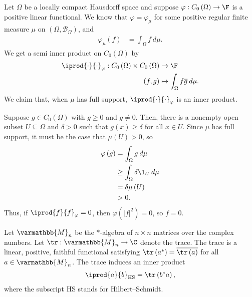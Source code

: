\documentclass[10pt]{mypackage}
\renewcommand*{\mathbb}[1]{\varmathbb{#1}}
\begin{document}
\begin{example}
  Let $\Omega$ be a locally compact Hausdorff space and suppose $\varphi: C_0\left(\Omega\right)\rightarrow \F$ is a positive linear functional. We know that $\varphi = \varphi_{\mu}$ for some positive regular finite measure $\mu$ on $\left(\Omega,\mathcal{B}_{\Omega}\right)$, and
  \begin{align*}
    \varphi_{\mu}\left(f\right) &= \int_{\Omega}^{} f\:d\mu.
  \end{align*}
  We get a semi inner product on $C_{0}\left(\Omega\right)$ by
  \begin{align*}
    \iprod{\cdot}{\cdot}_{\varphi}: C_0\left(\Omega\right)\times C_0\left(\Omega\right) &\rightarrow \F\\
    \left(f,g\right) &\mapsto \int_{\Omega}^{} f\overline{g}\:d\mu.
  \end{align*}
  We claim that, when $\mu$ has full support, $ \iprod{\cdot}{\cdot}_{\varphi} $ is an inner product.\newline

  Suppose $g\in C_0\left(\Omega\right)$ with $g\geq 0$ and $g \neq 0$. Then, there is a nonempty open subset $U\subseteq \Omega$ and $\delta > 0$ such that $g(x) \geq \delta$ for all $x\in U$. Since $\mu$ has full support, it must be the case that $\mu\left(U\right) > 0$, so
  \begin{align*}
    \varphi\left(g\right) &= \int_{\Omega}^{} g\:d\mu\\
                          &\geq \int_{\Omega}^{} \delta \1_{U}\:d\mu\\
                          &= \delta \mu\left(U\right)\\
                          &> 0.
  \end{align*}
  Thus, if $ \iprod{f}{f}_{\varphi} = 0 $, then $\varphi\left(\left\vert f \right\vert^2\right) = 0$, so $f = 0$.
\end{example}
\begin{example}
  Let $\mathbb{M}_{n}$ be the $\ast$-algebra of $n\times n$ matrices over the complex numbers. Let $\tr: \mathbb{M}_{n}\rightarrow \C$ denote the trace. The trace is a linear, positive, faithful functional satisfying $\tr\left(a^{\ast}\right) = \overline{\tr\left(a\right)}$ for all $a\in \mathbb{M}_{n}$. The trace induces an inner product
  \begin{align*}
    \iprod{a}{b}_{\text{HS}} = \tr\left(b^{\ast}a\right),
  \end{align*}
  where the subscript HS stands for Hilbert--Schmidt.
\end{example}
\end{document}
